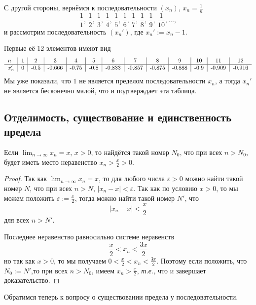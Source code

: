 \begin{example}
    С другой стороны, вернёмся к последовательности $(x_n)$, $x_n = \frac{1}{n}$
     \[
      \frac{1}{1}, \,\frac{1}{2}, \,\frac{1}{3}, \, \frac{1}{4}, \, \frac{1}{5}, \, \frac{1}{6},\, \frac{1}{7},\, \frac{1}{8},\, \frac{1}{9},\, \frac{1}{10},  \ldots,
    \]
и рассмотрим последовательность $(x_n')$, где $x_n':= x_n - 1$.

Первые её 12 элементов имеют вид
        \[
         \begin{tabular}{l|c|c|c|c|c|c|c|c|c|c|c|c}
             $n$ & 1&2&3&4&5&6&7&8&9&10&11&12  \\
             \hline
             $x_n'$&  0 & -0.5 & -0.666 & -0.75 & -0.8 & -0.833 & -0.857& -0.875 & -0.888 & -0.9 & -0.909 & -0.916
         \end{tabular}
        \]
Мы уже показали, что $1$ не является пределом последовательности $x_n$, а тогда $x_n'$ не является бесконечно малой, что и подтверждает эта таблица.
\end{example}




\subsection{Отделимость, существование и единственность предела}



\begin{theorem}[Отделимость]\label{separate}
    Если $\lim_{n\to \infty } x_n = x$, $x>0$, то найдётся такой номер $N_0$, что при всех $n>N_0$, будет иметь место неравенство $x_n > \frac{x}{2}>0.$
\end{theorem}

\begin{proof}
Так как $\lim_{n\to \infty } x_n = x$, то для любого числа $\varepsilon>0$ можно найти такой номер $N$, что при всех $n>N$, $|x_n-x|<\varepsilon$. Так как по условию $x>0$, то мы можем положить $\varepsilon := \frac{x}{2}$, тогда можно найти такой номер $N'$, что
\[
 |x_n - x|<\frac{x}{2}
\]
для всех $n>N'$.

Последнее неравенство равносильно системе неравенств
\[
 \frac{x}{2}< x_n < \frac{3x}{2}
\]
но так как $x>0$, то мы получаем $0<\frac{x}{2}< x_n < \frac{3x}{2}$. Поэтому если положить, что $N_0 :=N'$,то при всех $n>N_0$, имеем $x_n > \frac{x}{2}$, \textit{т.е.,} что и завершает доказательство.
\end{proof}

Обратимся теперь к вопросу о существовании предела у последовательности.

